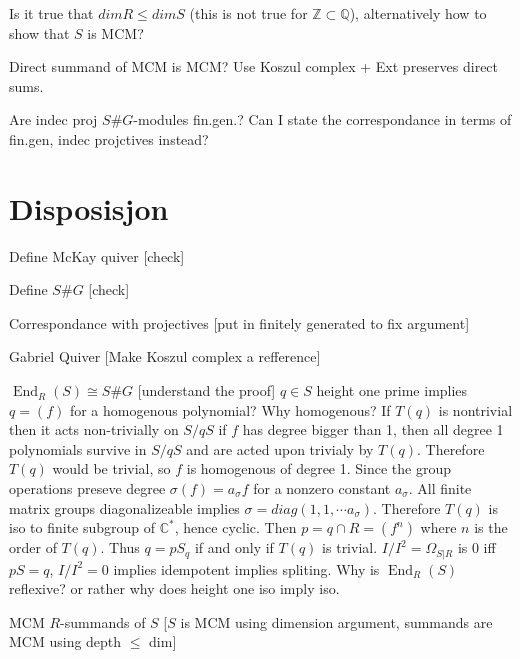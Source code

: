 \documentclass[11pt, a4paper, english]{article}
\numberwithin{prop}{section}
\numberwithin{lemma}{section}
\numberwithin{theorem}{section}
\numberwithin{defin}{section}
\numberwithin{example}{section}
\newcommand{\C}{\mathbb{C}}
\DeclareMathOperator{\End}{End}
\begin{document}
Is it true that $dim R \leq dim S$ (this is not true for $\mathbb{Z} \subset \mathbb{Q}$), alternatively how to show that $S$ is MCM?

Direct summand of MCM is MCM?  Use Koszul complex + Ext preserves direct sums.

Are indec proj $S\#G$-modules fin.gen.? Can I state the correspondance in terms of fin.gen, indec projctives instead?

\section{Disposisjon}
Define McKay quiver [check]

Define $S\#G$ [check]

Correspondance with projectives [put in finitely generated to fix argument]

Gabriel Quiver [Make Koszul complex a refference]

$\End_R(S) \cong S\#G$ [understand the proof]
$q \in S$ height one prime implies $q = (f)$ for a homogenous polynomial? Why homogenous?
If $T(q)$ is nontrivial then it acts non-trivially on $S/qS$ if $f$ has degree bigger than 1, then all degree 1 polynomials survive in $S/qS$ and are acted upon trivialy by $T(q)$. Therefore $T(q)$ would be trivial, so $f$ is homogenous of degree 1.
Since the group operations preseve degree $\sigma(f) = a_\sigma f$ for a nonzero constant $a_\sigma$. All finite matrix groups diagonalizeable implies $\sigma = diag(1,1, \cdots a_\sigma)$. Therefore $T(q)$ is iso to finite subgroup of $\C^*$, hence cyclic.
Then $p=q \cap R = (f^n)$ where $n$ is the order of $T(q)$. Thus $q = pS_q$ if and only if $T(q)$ is trivial.
$I/I^2 = \Omega_{S|R}$ is 0 iff $pS = q$, $I/I^2 = 0$ implies idempotent implies spliting.
Why is $\End_R(S)$ reflexive? or rather why does height one iso imply iso.

MCM $R$-summands of $S$ 
[$S$ is MCM using dimension argument, summands are MCM using depth $\leq$ dim]

\nocite{*}


\end{document}
